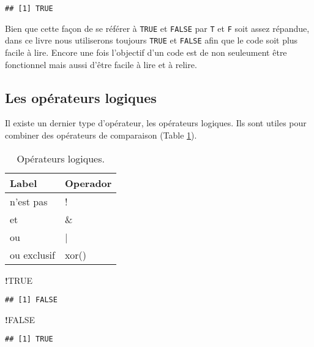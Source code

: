 \documentclass[]{book}
\newenvironment{Shaded}{\begin{snugshade}}{\end{snugshade}}
\newcommand{\OtherTok}[1]{\textcolor[rgb]{0.56,0.35,0.01}{#1}}
\newcommand{\OperatorTok}[1]{\textcolor[rgb]{0.81,0.36,0.00}{\textbf{#1}}}
\theoremstyle{definition}
\theoremstyle{definition}
\theoremstyle{definition}
\theoremstyle{remark}
\begin{document}
\begin{verbatim}
## [1] TRUE
\end{verbatim}

Bien que cette façon de se référer à \texttt{TRUE} et \texttt{FALSE} par
\texttt{T} et \texttt{F} soit assez répandue, dans ce livre nous
utiliserons toujours \texttt{TRUE} et \texttt{FALSE} afin que le code
soit plus facile à lire. Encore une fois l'objectif d'un code est de non
seuleument être fonctionnel mais aussi d'être facile à lire et à relire.

\subsection{Les opérateurs logiques}\label{l011oplog}

Il existe un dernier type d'opérateur, les opérateurs logiques. Ils sont
utiles pour combiner des opérateurs de comparaison (Table
\ref{tab:tabOpLog}).

\begin{table}

\caption{\label{tab:tabOpLog}Opérateurs logiques.\label{tab:tabOpLog}}
\centering
\begin{tabular}[t]{l|l}
\hline
Label & Operador\\
\hline
n'est pas & !\\
\hline
et & \&\\
\hline
ou & |\\
\hline
ou exclusif & xor()\\
\hline
\end{tabular}
\end{table}

\begin{Shaded}
\begin{Highlighting}[]
\OperatorTok{!}\OtherTok{TRUE}
\end{Highlighting}
\end{Shaded}

\begin{verbatim}
## [1] FALSE
\end{verbatim}

\begin{Shaded}
\begin{Highlighting}[]
\OperatorTok{!}\OtherTok{FALSE}
\end{Highlighting}
\end{Shaded}

\begin{verbatim}
## [1] TRUE
\end{verbatim}
\end{document}
